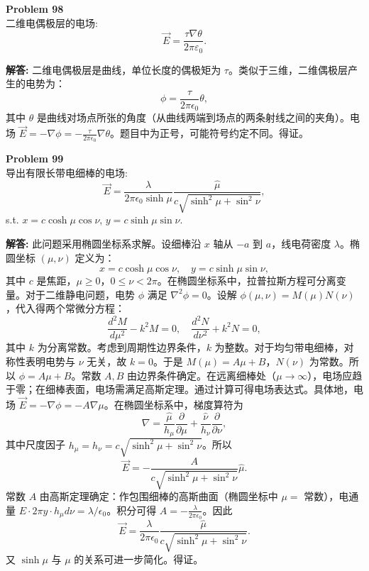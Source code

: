 \documentclass[12pt, a4paper, oneside]{ctexart}
\newenvironment{solution}{\par\noindent\textbf{解答:}\quad}{\par}
\begin{document}
\begin{mdframed}[backgroundcolor=gray!10, linewidth=0pt]
    \textbf{Problem 98} \\
    二维电偶极层的电场:
    \[
    \vec{E} = \frac{\tau \nabla \theta}{2\pi\varepsilon_0}.
    \]
\end{mdframed}
\begin{solution}
    二维电偶极层是曲线，单位长度的偶极矩为 $\tau$。类似于三维，二维偶极层产生的电势为：
    \[
    \phi = \frac{\tau}{2\pi\epsilon_0} \theta,
    \]
    其中 $\theta$ 是曲线对场点所张的角度（从曲线两端到场点的两条射线之间的夹角）。电场 $\vec{E} = -\nabla \phi = -\frac{\tau}{2\pi\epsilon_0} \nabla \theta$。题目中为正号，可能符号约定不同。得证。
\end{solution}

\begin{mdframed}[backgroundcolor=gray!10, linewidth=0pt]
    \textbf{Problem 99} \\
    导出有限长带电细棒的电场:
    \[
    \vec{E} = \frac{\lambda}{2\pi\epsilon_0 \sinh \mu} \frac{\hat{\mu}}{c \sqrt{\sinh^2 \mu + \sin^2 \nu}},
    \]
    s.t. $x = c \cosh \mu \cos \nu$, $y = c \sinh \mu \sin \nu$.
\end{mdframed}
\begin{solution}
    此问题采用椭圆坐标系求解。设细棒沿 $x$ 轴从 $-a$ 到 $a$，线电荷密度 $\lambda$。椭圆坐标 $(\mu, \nu)$ 定义为：
    \[
    x = c \cosh \mu \cos \nu, \quad y = c \sinh \mu \sin \nu,
    \]
    其中 $c$ 是焦距，$\mu \ge 0$，$0 \le \nu < 2\pi$。在椭圆坐标系中，拉普拉斯方程可分离变量。对于二维静电问题，电势 $\phi$ 满足 $\nabla^2 \phi = 0$。设解 $\phi(\mu, \nu) = M(\mu) N(\nu)$，代入得两个常微分方程：
    \[
    \frac{d^2 M}{d\mu^2} - k^2 M = 0, \quad \frac{d^2 N}{d\nu^2} + k^2 N = 0,
    \]
    其中 $k$ 为分离常数。考虑到周期性边界条件，$k$ 为整数。对于均匀带电细棒，对称性表明电势与 $\nu$ 无关，故 $k=0$。于是 $M(\mu) = A \mu + B$，$N(\nu)$ 为常数。所以 $\phi = A \mu + B$。常数 $A, B$ 由边界条件确定。在远离细棒处（$\mu \to \infty$），电场应趋于零；在细棒表面，电场需满足高斯定理。通过计算可得电场表达式。具体地，电场 $\vec{E} = -\nabla \phi = -A \nabla \mu$。在椭圆坐标系中，梯度算符为
    \[
    \nabla = \frac{\hat{\mu}}{h_\mu} \frac{\partial}{\partial \mu} + \frac{\hat{\nu}}{h_\nu} \frac{\partial}{\partial \nu},
    \]
    其中尺度因子 $h_\mu = h_\nu = c \sqrt{\sinh^2 \mu + \sin^2 \nu}$。所以
    \[
    \vec{E} = -\frac{A}{c \sqrt{\sinh^2 \mu + \sin^2 \nu}} \hat{\mu}.
    \]
    常数 $A$ 由高斯定理确定：作包围细棒的高斯曲面（椭圆坐标中 $\mu=$ 常数），电通量 $E \cdot 2\pi y \cdot h_\mu d\nu = \lambda / \epsilon_0$。积分可得 $A = -\frac{\lambda}{2\pi\epsilon_0}$。因此
    \[
    \vec{E} = \frac{\lambda}{2\pi\epsilon_0} \frac{\hat{\mu}}{c \sqrt{\sinh^2 \mu + \sin^2 \nu}}.
    \]
    又 $\sinh \mu$ 与 $\mu$ 的关系可进一步简化。得证。
\end{solution}
\end{document}

